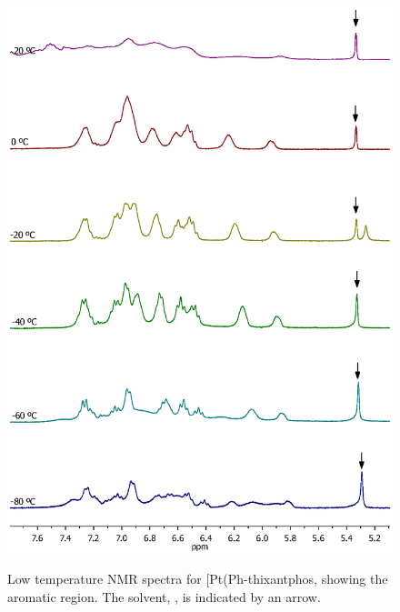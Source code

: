 \begin{figure}[htbp]
\begin{center}
\vspace{0.5cm}
\includegraphics[scale = 0.9, trim = 2cm 2.5cm 1.7cm 4cm, clip]{../NMR/1031-Pt(SPh)2-Proton.eps}
\caption[Low temperature \proton{} NMR spectra for [Pt(Ph-thixantphos\ce{)2}{]}]{Low temperature \proton{} NMR spectra for [Pt(Ph-thixantphos\ce{)2]}, showing the aromatic region.  The solvent, , is indicated by an arrow.}
\vspace{0.2cm}
\label{BisSPhPt:HNMR}
\end{center}
\end{figure}
\vspace{0.2cm}

